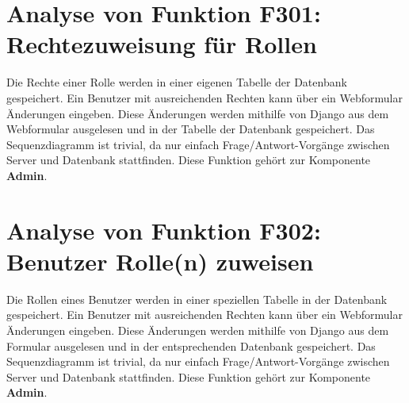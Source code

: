 \section{Analyse von Funktion F301: Rechtezuweisung für Rollen}
Die Rechte einer Rolle werden in einer eigenen Tabelle der Datenbank gespeichert. Ein Benutzer mit ausreichenden Rechten kann über ein Webformular Änderungen eingeben. Diese Änderungen werden mithilfe von Django aus dem Webformular ausgelesen und in der Tabelle der Datenbank gespeichert. Das Sequenzdiagramm ist trivial, da nur einfach Frage/Antwort-Vorgänge zwischen Server und Datenbank stattfinden. Diese Funktion gehört zur Komponente \textbf{Admin}.

\section{Analyse von Funktion F302: Benutzer Rolle(n) zuweisen}
Die Rollen eines Benutzer werden in einer speziellen Tabelle in der Datenbank gespeichert. Ein Benutzer mit ausreichenden Rechten kann über ein Webformular Änderungen eingeben. Diese Änderungen werden mithilfe von Django aus dem Formular ausgelesen und in der entsprechenden Datenbank gespeichert. Das Sequenzdiagramm ist trivial, da nur einfach Frage/Antwort-Vorgänge zwischen Server und Datenbank stattfinden. Diese Funktion gehört zur Komponente \textbf{Admin}.
